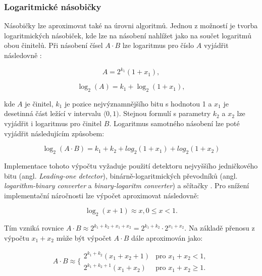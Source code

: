 \subsubsection{Logaritmické násobičky}
Násobičky lze aproximovat také na úrovni algoritmů. Jednou z možností je tvorba logaritmických násobiček, kde lze na násobení nahlížet jako na součet logaritmů obou činitelů. Při násobení čísel $A \cdot B$ lze logaritmus pro číslo $A$ vyjádřit následovně \cite{mitchell_log}:

\begin{equation}
    A = 2^{k_1}(1+x_1),
\end{equation}

\begin{equation}
    \log_2(A) = k_1 + \log_2(1+x_1),
\end{equation}

kde $A$ je činitel, $k_1$ je pozice nejvýznamnějšího bitu s hodnotou 1 a $x_1$ je desetinná část ležící v intervalu $\langle0,1)$. Stejnou formulí s parametry $k_2$ a $x_2$ lze vyjádřit i logaritmus pro činitel $B$. Logaritmus samotného násobení lze poté vyjádřit následujícím způsobem:

\begin{equation}
    \log_2(A \cdot B) = k_1 + k_2 + log_2(1+x_1) + log_2(1 + x_2)
\end{equation}

Implementace tohoto výpočtu vyžaduje použití detektoru nejvyššího jedničkového bitu (angl. \textit{Leading-one detector}), binárně-logaritmických převodníků (angl. \textit{logarithm-binary converter} a \textit{binary-logaritm converter}) a sčítačky \cite{approx_mult_survey}. Pro snížení implementační náročnosti lze výpočet aproximovat následovně:

\begin{equation}
    \log_2(x+1) \approx x, 0 \leq x < 1.
\end{equation}

Tím vzniká rovnice $A \cdot B \approx 2^{k_1+k_2+x_1+x_2} = 2^{k_1+k_2} \cdot 2^{x_1+x_2}$. Na základě přenosu z výpočtu $x_1 + x_2$ může být výpočet $A \cdot B$ dále aproximován jako:

\begin{equation}
    A \cdot B \approx \Bigg\{ 
    \begin{array}{ll}
        2^{k_1+k_2}(x_1+x_2+1) & \text{pro } x_1 + x_2 < 1, \\
        2^{k_1+k_2+1}(x_1+x_2) & \text{pro } x_1 + x_2 \geq 1.
    \end{array}
\end{equation}

